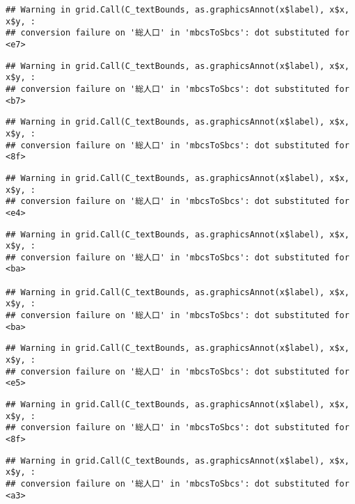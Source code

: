 \documentclass[
]{article}
\begin{document}
\begin{verbatim}
## Warning in grid.Call(C_textBounds, as.graphicsAnnot(x$label), x$x, x$y, :
## conversion failure on '総人口' in 'mbcsToSbcs': dot substituted for <e7>
\end{verbatim}

\begin{verbatim}
## Warning in grid.Call(C_textBounds, as.graphicsAnnot(x$label), x$x, x$y, :
## conversion failure on '総人口' in 'mbcsToSbcs': dot substituted for <b7>
\end{verbatim}

\begin{verbatim}
## Warning in grid.Call(C_textBounds, as.graphicsAnnot(x$label), x$x, x$y, :
## conversion failure on '総人口' in 'mbcsToSbcs': dot substituted for <8f>
\end{verbatim}

\begin{verbatim}
## Warning in grid.Call(C_textBounds, as.graphicsAnnot(x$label), x$x, x$y, :
## conversion failure on '総人口' in 'mbcsToSbcs': dot substituted for <e4>
\end{verbatim}

\begin{verbatim}
## Warning in grid.Call(C_textBounds, as.graphicsAnnot(x$label), x$x, x$y, :
## conversion failure on '総人口' in 'mbcsToSbcs': dot substituted for <ba>

## Warning in grid.Call(C_textBounds, as.graphicsAnnot(x$label), x$x, x$y, :
## conversion failure on '総人口' in 'mbcsToSbcs': dot substituted for <ba>
\end{verbatim}

\begin{verbatim}
## Warning in grid.Call(C_textBounds, as.graphicsAnnot(x$label), x$x, x$y, :
## conversion failure on '総人口' in 'mbcsToSbcs': dot substituted for <e5>
\end{verbatim}

\begin{verbatim}
## Warning in grid.Call(C_textBounds, as.graphicsAnnot(x$label), x$x, x$y, :
## conversion failure on '総人口' in 'mbcsToSbcs': dot substituted for <8f>
\end{verbatim}

\begin{verbatim}
## Warning in grid.Call(C_textBounds, as.graphicsAnnot(x$label), x$x, x$y, :
## conversion failure on '総人口' in 'mbcsToSbcs': dot substituted for <a3>
\end{verbatim}
\end{document}
